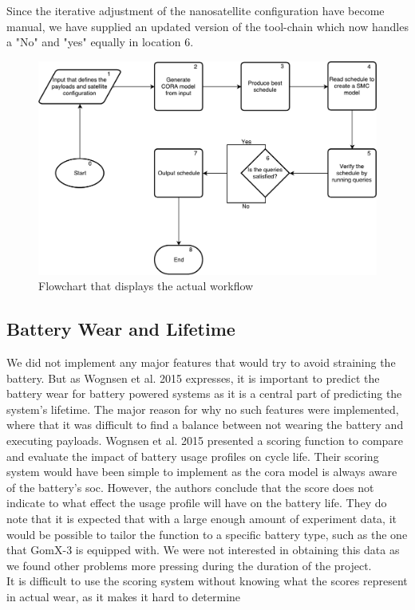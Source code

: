 Since the iterative adjustment of the nanosatellite configuration have become manual, we have supplied an updated version of the tool-chain which now handles a "No" and "yes" equally in location 6.
\begin{figure}[h]
	\includegraphics[width=\textwidth]{graphics/flow_act.pdf}
	\caption{Flowchart that displays the actual workflow}
	\label{fig:tool_act}
\end{figure}

\subsection{Battery Wear and Lifetime} \label{subsec:disc_life}
We did not implement any major features that would try to avoid straining the battery. 
But as Wognsen et al. 2015\cite{score_function} expresses, it is important to predict the battery wear for battery powered systems as it is a central part of predicting the system's lifetime.
The major reason for why no such features were implemented, where that it was difficult to find a balance between not wearing the battery and executing payloads.
Wognsen et al. 2015\cite{score_function} presented a scoring function to compare and evaluate the impact of battery usage profiles on cycle life. Their scoring system would have been simple to implement as the \gls{cora} model is always aware of the battery's \gls{soc}. However, the authors conclude that the score does not indicate to what effect the usage profile will have on the battery life. They do note that it is expected that with a large enough amount of experiment data, it would be possible to tailor the function to a specific battery type, such as the one that GomX-3 is equipped with. We were not interested in obtaining this data as we found other problems more pressing during the duration of the project.\\
It is difficult to use the scoring system without knowing what the scores represent in actual wear, as it makes it hard to determine 


